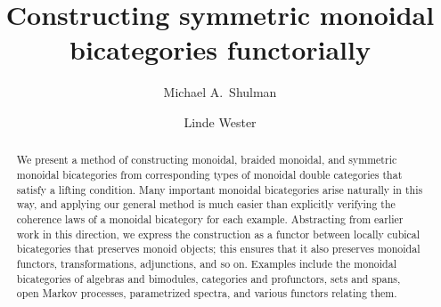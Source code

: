\documentclass{amsart}
\title{Constructing symmetric monoidal bicategories functorially}
\author{Michael A.\ Shulman}
\author{Linde Wester}
\newcounter{mondbl}             %
\begin{document}
\begin{abstract}
  We present a method of constructing monoidal, braided monoidal, and symmetric monoidal bicategories from corresponding types of monoidal double categories that satisfy a lifting condition.
  Many important monoidal bicategories arise naturally in this way, and applying our general method is much easier than explicitly verifying the coherence laws of a monoidal bicategory for each example.
  Abstracting from earlier work in this direction, we express the construction as a functor between locally cubical bicategories that preserves monoid objects; this ensures that it also preserves monoidal functors, transformations, adjunctions, and so on.
  Examples include the monoidal bicategories of algebras and bimodules, categories and profunctors, sets and spans, open Markov processes, parametrized spectra, and various functors relating them.
\end{abstract}

\maketitle
\setcounter{tocdepth}{1}
\tableofcontents











%

%


 



\appendix

\end{document}
